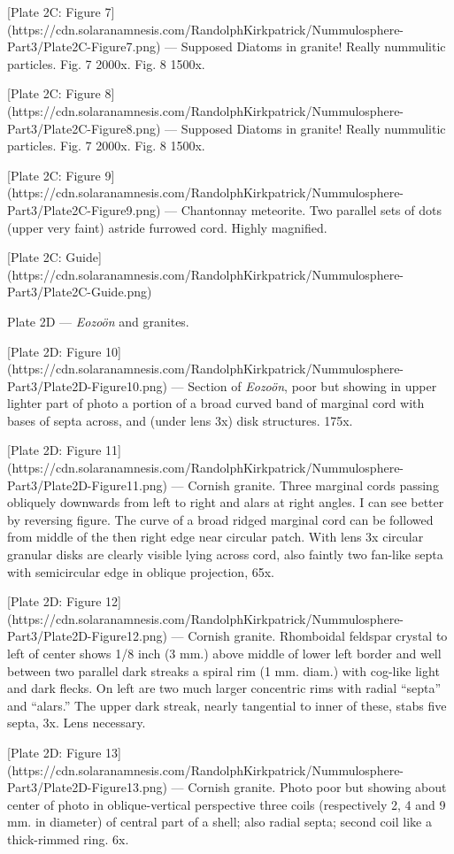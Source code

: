 \documentclass[a4paper, 12pt, oneside]{article}
\begin{document}
[Plate 2C: Figure 7](https://cdn.solaranamnesis.com/RandolphKirkpatrick/Nummulosphere-Part3/Plate2C-Figure7.png) --- Supposed Diatoms in granite! Really nummulitic particles. Fig. 7 2000x. Fig. 8 1500x.

[Plate 2C: Figure 8](https://cdn.solaranamnesis.com/RandolphKirkpatrick/Nummulosphere-Part3/Plate2C-Figure8.png) --- Supposed Diatoms in granite! Really nummulitic particles. Fig. 7 2000x. Fig. 8 1500x.

[Plate 2C: Figure 9](https://cdn.solaranamnesis.com/RandolphKirkpatrick/Nummulosphere-Part3/Plate2C-Figure9.png) --- Chantonnay meteorite. Two parallel sets of dots (upper very faint) astride furrowed cord. Highly magnified.

[Plate 2C: Guide](https://cdn.solaranamnesis.com/RandolphKirkpatrick/Nummulosphere-Part3/Plate2C-Guide.png)

Plate 2D --- \emph{Eozoön} and granites.

[Plate 2D: Figure 10](https://cdn.solaranamnesis.com/RandolphKirkpatrick/Nummulosphere-Part3/Plate2D-Figure10.png) --- Section of \emph{Eozoön}, poor but showing in upper lighter part of photo a portion of a broad curved band of marginal cord with bases of septa across, and (under lens 3x) disk structures. 175x.

[Plate 2D: Figure 11](https://cdn.solaranamnesis.com/RandolphKirkpatrick/Nummulosphere-Part3/Plate2D-Figure11.png) --- Cornish granite. Three marginal cords passing obliquely downwards from left to right and alars at right angles. I can see better by reversing figure. The curve of a broad ridged marginal cord can be followed from middle of the then right edge near circular patch. With lens 3x circular granular disks are clearly visible lying across cord, also faintly two fan-like septa with semicircular edge in oblique projection, 65x.

[Plate 2D: Figure 12](https://cdn.solaranamnesis.com/RandolphKirkpatrick/Nummulosphere-Part3/Plate2D-Figure12.png) --- Cornish granite. Rhomboidal feldspar crystal to left of center shows 1/8 inch (3 mm.) above middle of lower left border and well between two parallel dark streaks a spiral rim (1 mm. diam.) with cog-like light and dark flecks. On left are two much larger concentric rims with radial ``septa'' and ``alars.'' The upper dark streak, nearly tangential to inner of these, stabs five septa, 3x. Lens necessary.

[Plate 2D: Figure 13](https://cdn.solaranamnesis.com/RandolphKirkpatrick/Nummulosphere-Part3/Plate2D-Figure13.png) --- Cornish granite. Photo poor but showing about center of photo in oblique-vertical perspective three coils (respectively 2, 4 and 9 mm. in diameter) of central part of a shell; also radial septa; second coil like a thick-rimmed ring. 6x.
\end{document}

